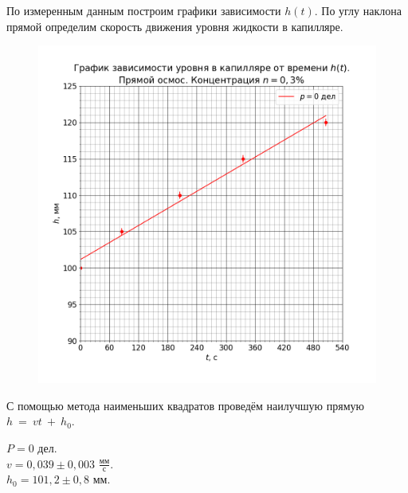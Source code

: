 По измеренным данным построим графики зависимости $h(t)$. По углу наклона прямой определим скорость движения уровня жидкости в капилляре.


\begin{figure}[H]
	\centering
	\includegraphics[width=1 \textwidth]{../plots/graph h_t n0.3 straight.png}
\end{figure}

С помощью метода наименьших квадратов проведём наилучшую прямую $h~=~vt~+~h_0$.

$P = 0$ дел. \\
$v = 0,039 \pm 0,003$ $\frac{мм}{с}$. \\
$h_0 = 101,2 \pm 0,8$ мм.

